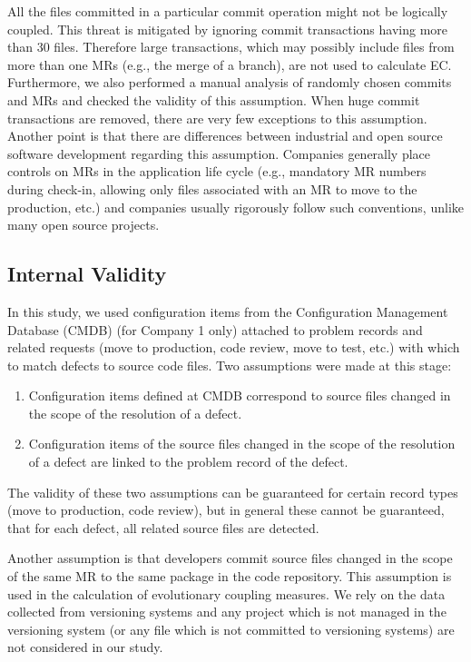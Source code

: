 \documentclass[times]{smrauth}
\begin{document}
All the files committed in a particular commit operation might not be logically coupled. This threat is mitigated by ignoring commit transactions having more than 30 files. Therefore large transactions, which may possibly include files from more than one MRs (e.g., the merge of a branch), are not used to calculate EC. Furthermore, we also performed a manual analysis of randomly chosen commits and MRs and checked the validity of this assumption. When huge commit transactions are removed, there are very few exceptions to this assumption. Another point is that there are differences between industrial and open source software development regarding this assumption. Companies generally place controls on MRs in the application life cycle  (e.g., mandatory MR numbers during check-in, allowing only files associated with an MR to move to the production, etc.) and companies usually rigorously follow such conventions, unlike many open source projects.


\subsection{Internal Validity}

In this study, we used configuration items from the Configuration Management Database (CMDB) (for Company 1 only) attached to problem records and related requests (move to production, code review, move to test, etc.) with which to match defects to source code files. Two assumptions were made at this stage:

\vspace{-1.5mm} 
\begin{enumerate}
\item Configuration items defined at CMDB correspond to source files changed in the scope of the resolution of a defect.
\item Configuration items of the source files changed in the scope of the resolution of a defect are linked to the problem record of the defect.
\end{enumerate}

The validity of these two assumptions can be guaranteed for certain record types (move to production, code review), but in general these cannot be guaranteed, that for each defect, all related source files are detected.

Another assumption is that developers commit source files changed in the scope of the same MR to the same package in the code repository. This assumption is used in the calculation of evolutionary coupling measures. We rely on the data collected from versioning systems and any project which is not managed in the versioning system (or any file which is not committed to versioning systems) are not considered in our study.
\end{document}
